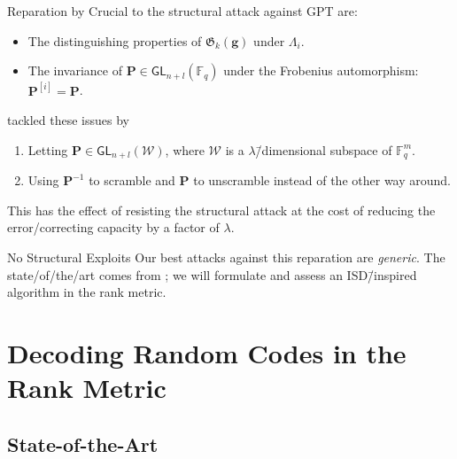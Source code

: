 \documentclass[usepdftitle=false]{beamer}
\renewcommand*{\vec}{\symbf}
\newcommand*{\mat}{\symbf}
\newcommand*{\GL}{\ensuremath{\mathsf{GL}}}
\newcommand*{\FF}{\ensuremath{\mathbb{F}}}
\newcommand*{\Gab}{\ensuremath{\mathfrak{G}}}
\begin{document}
\begin{frame}{Reparation by \citeauthor{Loi17}}
  Crucial to the structural attack against GPT are:
  \begin{itemize}
  \item The distinguishing properties of \(\Gab_k(\vec{g})\) under
    \(\Lambda_i\).
  \item The invariance of \(\mat{P} \in \GL_{n + l}(\FF_q)\) under the
    Frobenius automorphism: \(\mat{P}^{[i]} = \mat{P}\).
  \end{itemize}
   tackled these issues by
  \begin{enumerate}
  \item Letting \(\mat{P} \in \GL_{n + l}(\mathcal{W})\), where
    \(\mathcal{W}\) is a \(\lambda\)\=/dimensional subspace of
    \(\FF_q^m\).
  \item Using \(\mat{P}^{-1}\) to scramble and \(\mat{P}\) to
    unscramble instead of the other way around.
  \end{enumerate}
  This has the effect of \alert{resisting the structural attack} at
  the cost of reducing the error\-/correcting capacity by a factor of
  \(\lambda\).
  \begin{alertblock}{No Structural Exploits}
    Our best attacks against this reparation are \emph{generic}.  The
    state\-/of\-/the\-/art comes from \citeauthor{GRS13}; we will
    formulate and assess an ISD\=/inspired algorithm in the rank
    metric.
  \end{alertblock}
\end{frame}

\section{Decoding Random Codes in the Rank Metric}

\subsection{State-of-the-Art}
\end{document}
